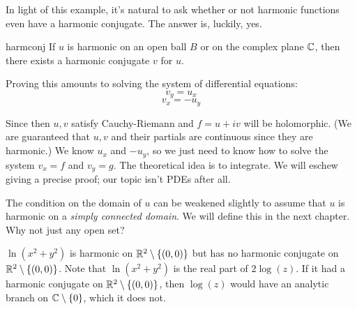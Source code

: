 In light of this example, it's natural to ask whether or not harmonic functions even have a harmonic conjugate. The answer is, luckily, yes.	

\begin{thmbo}{}{harmconj} If $u$ is harmonic on an open ball $B$ or on the complex plane $\mathbb{C}$, then there exists a harmonic conjugate $v$ for $u$.
\end{thmbo}

Proving this amounts to solving the system of differential equations:
$$v_y = u_x$$
$$v_x = -u_y$$

Since then $u,v$ satisfy Cauchy-Riemann and $f = u + iv$ will be holomorphic. (We are guaranteed that $u,v$ and their partials are continuous since they are harmonic.) We know $u_x$ and $-u_y$, so we just need to know how to solve the system $v_x = f$ and $v_y = g$. The theoretical idea is to integrate. We will eschew giving a precise proof; our topic isn't PDEs after all.

The condition on the domain of $u$ can be weakened slightly to assume that $u$ is harmonic on a \textit{simply connected domain}. We will define this in the next chapter. Why not just any open set?

\begin{ex}{}{} $\ln(x^2+y^2)$ is harmonic on $\mathbb{R}^2\setminus\{(0,0)\}$ but has no harmonic conjugate on $\mathbb{R}^2\setminus\{(0,0)\}$. Note that $\ln(x^2+y^2)$ is the real part of $2\log(z)$. If it had a harmonic conjugate on $\mathbb{R}^2\setminus\{(0,0)\}$, then $\log(z)$ would have an analytic branch on $\mathbb{C}\setminus\{0\}$, which it does not.
\end{ex}

